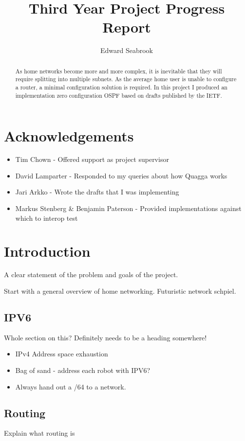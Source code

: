 \documentclass[12pt]{report}
\author{Edward Seabrook}
\title{Third Year Project Progress Report}
\begin{document}


\begin{abstract}
As home networks become more and more complex, it is inevitable that they will
require splitting into multiple subnets. As the average home user is unable to
configure a router, a minimal configuration solution is required. In this
project I produced an implementation zero configuration OSPF based on drafts
published by the IETF. 
\end{abstract}

\tableofcontents
\clearpage

\chapter{Acknowledgements}

\begin{itemize}
\item Tim Chown - Offered support as project supervisor
\item David Lamparter - Responded to my queries about how Quagga works
\item Jari Arkko - Wrote the drafts that I was implementing

\item Markus Stenberg \& Benjamin Paterson - Provided implementations against which to interop test
\end{itemize}

\chapter{Introduction}
A clear statement of the problem and goals of the project.

Start with a general overview of home networking. Futuristic network schpiel.

\section{IPV6}
Whole section on this? Definitely needs to be a heading somewhere!

\begin{itemize}
\item IPv4 Address space exhaustion
\item Bag of sand - address each robot with IPV6?
\item Always hand out a /64 to a network.
\end{itemize}

\section{Routing}
Explain what routing is
\end{document}

